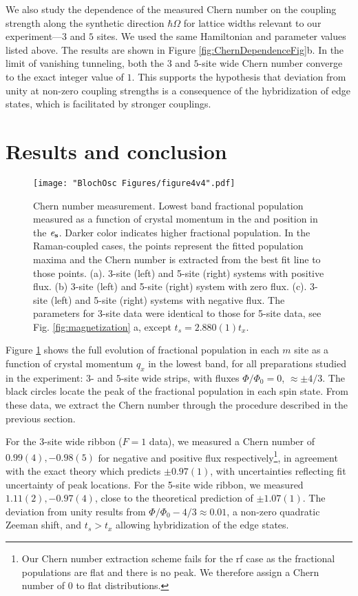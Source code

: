 We also study the dependence of the measured Chern number on the coupling strength along the synthetic direction $\hbar\Omega$ for lattice widths relevant to our experiment---$3$ and $5$ sites. We used the same Hamiltonian and parameter values listed above. The results are shown in  Figure \ref{fig:ChernDependenceFig}b. In the limit of vanishing tunneling, both the $3$ and $5$-site wide Chern number converge to the exact integer value of $1$. This supports the hypothesis that deviation from unity at non-zero coupling strengths is a consequence of the hybridization of edge states, which is facilitated by stronger couplings. 

\section{Results and conclusion}

\begin{figure}
\texttt{[image: "BlochOsc Figures/figure4v4".pdf]}
\caption[Chern number measurement] {Chern number measurement. Lowest band fractional population measured as a function of crystal momentum in the  \ex  and position in the $\bf{\mathit{e}_s}$. Darker color indicates higher fractional population. In the Raman-coupled cases, the points represent the fitted population maxima and the Chern number is extracted from the best fit line to those points.  (a). 3-site (left) and 5-site (right) systems with positive flux.  (b) 3-site (left) and 5-site (right) system with zero flux.  (c). 3-site (left) and 5-site (right) systems with negative flux. The parameters for 3-site data were identical to those for 5-site data, see Fig. \ref{fig:magnetization} a, except $t_s =2.880(1)t_x$.}
\label{fig:finalData}
\end{figure}

Figure \ref{fig:finalData} shows the full evolution of fractional population in each $m$ site as a function of crystal momentum $q_x$ in the lowest band, for all preparations studied in the experiment: $3$- and $5$-site wide strips, with fluxes $\Phi/\Phi_0 = 0$, $\approx\pm 4/3$.   The black circles locate the peak of the fractional population in each spin state. From these data, we extract the Chern number through the procedure described in the previous section.

 For the 3-site wide ribbon ($F=1$ data), we measured a Chern number of $0.99(4), -0.98(5)$ for negative and positive flux respectively\footnote{Our Chern number extraction scheme fails for the rf case as the fractional populations are flat and there is no peak. We therefore assign a Chern number of $0$ to flat distributions.}, in agreement with the exact theory which predicts $\pm0.97(1)$, with uncertainties reflecting fit uncertainty of peak locations.  For the 5-site wide ribbon,  we measured $1.11(2), -0.97(4)$, close to the theoretical prediction of $\pm 1.07(1)$. The deviation from unity results from $\Phi/\Phi_0-4/3\approx0.01$, a non-zero quadratic Zeeman shift, and $t_s>t_x$ allowing hybridization of the edge states\cite{Mugel2017}.

